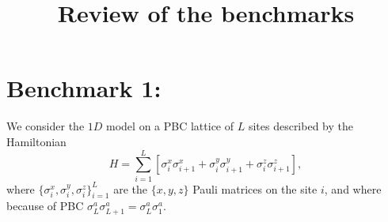 \documentclass[10pt,a4paper,twoside,twocolumn]{revtex4-1}
\begin{document}
\title{Review of the benchmarks}
\maketitle
\section{Benchmark 1:}
We consider the $1D$ model on a PBC lattice of $L$ sites described by the Hamiltonian
\begin{equation}
H=\sum_{i=1}^L \left[ \sigma^{x}_{i} \sigma^{x}_{i+1} + \sigma^{y}_{i} \sigma^{y}_{i+1} + \sigma^{z}_{i} \sigma^{z}_{i+1}\right], 
\end{equation}
where $\{\sigma^{x}_i,\sigma^{y}_i,\sigma^{z}_i\}^{L}_{i=1}$ are the $\{x,y,z\}$ Pauli matrices on the site $i$, and where because of PBC $\sigma^{a}_{L} \sigma^{a}_{L+1} = \sigma^{a}_{L}\sigma^{a}_{1}$.\\
\end{document}
